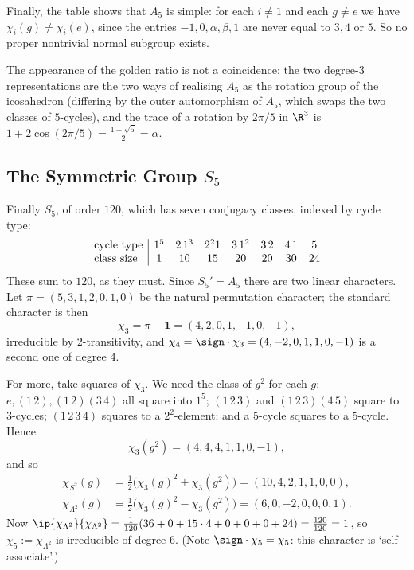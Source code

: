 Finally, the table shows that $A_5$ is simple: for each $i\neq 1$ and each $g\neq e$ we have $\chi_i(g)\neq\chi_i(e)$, since the entries $-1,0,\alpha,\beta,1$ are never equal to $3,4$ or $5$. So no proper nontrivial normal subgroup exists.

\begin{remark}
	The appearance of the golden ratio is not a coincidence: the two degree-$3$ representations are the two ways of realising $A_5$ as the rotation group of the icosahedron (differing by the outer automorphism of $A_5$, which swaps the two classes of $5$-cycles), and the trace of a rotation by $2\pi/5$ in $\R^3$ is $1 + 2\cos(2\pi/5) = \frac{1+\sqrt5}{2} = \alpha$.
\end{remark}

\subsection{The Symmetric Group \texorpdfstring{$S_5$}{S5}}

Finally $S_5$, of order $120$, which has seven conjugacy classes, indexed by cycle type:
$$\setlength{\arraycolsep}{5pt}\begin{array}{l|ccccccc}
\text{cycle type} & 1^5 & 2\,1^3 & 2^2 1 & 3\,1^2 & 3\,2 & 4\,1 & 5\\
\text{class size} & 1 & 10 & 15 & 20 & 20 & 30 & 24
\end{array}$$
These sum to $120$, as they must. Since $S_5' = A_5$ there are two linear characters. Let $\pi = (5,3,1,2,0,1,0)$ be the natural permutation character; the standard character is then
$$\chi_3 = \pi - \mathbf 1 = (4,2,0,1,-1,0,-1),$$
irreducible by $2$-transitivity, and $\chi_4 = \sign\cdot\chi_3 = (4,-2,0,1,1,0,-1)$ is a second one of degree $4$.

For more, take squares of $\chi_3$. We need the class of $g^2$ for each $g$: $e,(1\,2),(1\,2)(3\,4)$ all square into $1^5$; $(1\,2\,3)$ and $(1\,2\,3)(4\,5)$ square to $3$-cycles; $(1\,2\,3\,4)$ squares to a $2^2$-element; and a $5$-cycle squares to a $5$-cycle. Hence
$$\chi_3(g^2) = (4,4,4,1,1,0,-1),$$
and so
\begin{align*}
	\chi_{S^2}(g) &= \tfrac12\big(\chi_3(g)^2+\chi_3(g^2)\big) = (10,4,2,1,1,0,0),\\
	\chi_{\Lambda^2}(g) &= \tfrac12\big(\chi_3(g)^2-\chi_3(g^2)\big) = (6,0,-2,0,0,0,1).
\end{align*}
Now $\ip{\chi_{\Lambda^2}}{\chi_{\Lambda^2}} = \frac1{120}(36 + 0 + 15\cdot4+0+0+0+24) = \frac{120}{120} = 1$, so $\chi_5 := \chi_{\Lambda^2}$ is irreducible of degree $6$. (Note $\sign\cdot\chi_5 = \chi_5$: this character is `self-associate'.)


